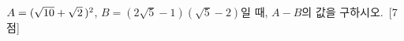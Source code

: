 $A=(\sqrt{10}+\sqrt{2}\mkern3mu )^2$, $B=(2\sqrt{5}-1)(\sqrt{5}-2)$일 때, $A-B$의 값을 구하시오.~\mbox{\mbox{[7점]}}
